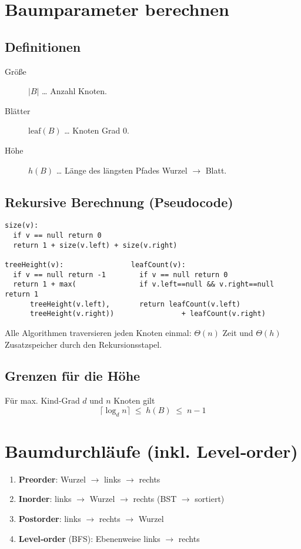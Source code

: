 \section{Baumparameter berechnen}
\subsection*{Definitionen}
\begin{description}
  \item[Größe] $|B|$ … Anzahl Knoten.
  \item[Blätter] $\mathrm{leaf}(B)$ … Knoten Grad $0$.
  \item[Höhe] $h(B)$ … Länge des längsten Pfades Wurzel $\rightarrow$ Blatt.
\end{description}

\subsection*{Rekursive Berechnung (Pseudocode)}
\begin{verbatim}
size(v):
  if v == null return 0
  return 1 + size(v.left) + size(v.right)

treeHeight(v):                leafCount(v):
  if v == null return -1        if v == null return 0
  return 1 + max(               if v.left==null && v.right==null return 1
      treeHeight(v.left),       return leafCount(v.left)
      treeHeight(v.right))                + leafCount(v.right)
\end{verbatim}
Alle Algorithmen traversieren jeden Knoten einmal: $\Theta(n)$ Zeit und
$\Theta(h)$ Zusatzspeicher durch den Rekursionsstapel.

\subsection*{Grenzen für die Höhe}
Für max. Kind‐Grad $d$ und $n$ Knoten gilt
\[\boxed{\;\lceil\log_d n\rceil \;\le\; h(B) \;\le\; n-1\;}\]

\section{Baumdurchläufe (inkl. Level‑order)}
\begin{enumerate}
  \item \textbf{Preorder}: Wurzel $\rightarrow$ links $\rightarrow$ rechts
  \item \textbf{Inorder}: links $\rightarrow$ Wurzel $\rightarrow$ rechts (BST $\rightarrow$ sortiert)
  \item \textbf{Postorder}: links $\rightarrow$ rechts $\rightarrow$ Wurzel
  \item \textbf{Level‑order} (BFS): Ebenenweise links $\rightarrow$ rechts
\end{enumerate}


